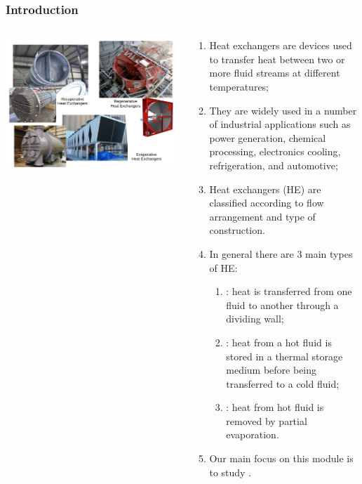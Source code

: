 \documentclass[10pt,compress,unknownkeysallowed]{beamer}
\begin{document}
\begin{frame}
 \frametitle{Introduction}
    \begin{columns}
       \begin{column}[l]{0.58\linewidth}
         \includegraphics[width=1.1\columnwidth,clip]{./Pics/HeatExchangers_Examples}
       \end{column}
       \begin{column}[l]{0.42\linewidth}
          \begin{enumerate}\scriptsize
              \item<1-> Heat exchangers are devices used to transfer heat between two or more fluid streams at different temperatures;
              \item<2-> They are widely used in a number of industrial applications such as power generation, chemical processing, electronics cooling, refrigeration, and automotive;
              \item<3-> Heat exchangers (HE) are classified according to flow arrangement and type of construction.
              \item<3-> In general there are 3 main types of HE:
                \begin{enumerate}\scriptsize
                  \item<3-> : heat is transferred from one fluid to another through a dividing wall;
                  \item<3-> : heat from a hot fluid is stored in a thermal storage medium before being transferred to a cold fluid;
                  \item<3-> : heat from hot fluid is removed by partial evaporation.
                \end{enumerate}
               \item<4-> Our main focus on this module is to study .
          \end{enumerate}
       \end{column}      
    \end{columns}
\end{frame}
\end{document}
